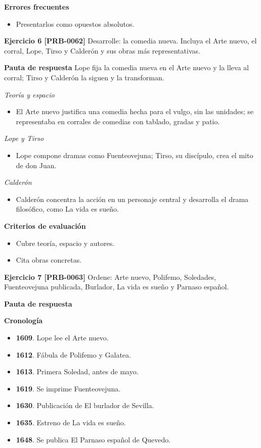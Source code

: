 \documentclass{book}
\begin{document}
\noindent\textbf{Errores frecuentes}
\begin{itemize}
\item Presentarlos como opuestos absolutos.
\end{itemize}

\noindent\textbf{Ejercicio 6 [PRB-0062]}
Desarrolle: la comedia nueva. Incluya el Arte nuevo, el corral, Lope, Tirso y Calderón y sus obras más representativas.


\noindent\textbf{Pauta de respuesta}
Lope fija la comedia nueva en el Arte nuevo y la lleva al corral; Tirso y Calderón la siguen y la transforman.


\noindent\textit{Teoría y espacio}
\begin{itemize}
\item El Arte nuevo justifica una comedia hecha para el vulgo, sin las unidades; se representaba en corrales de comedias con tablado, gradas y patio.
\end{itemize}

\noindent\textit{Lope y Tirso}
\begin{itemize}
\item Lope compone dramas como Fuenteovejuna; Tirso, su discípulo, crea el mito de don Juan.
\end{itemize}

\noindent\textit{Calderón}
\begin{itemize}
\item Calderón concentra la acción en un personaje central y desarrolla el drama filosófico, como La vida es sueño.
\end{itemize}

\noindent\textbf{Criterios de evaluación}
\begin{itemize}
\item Cubre teoría, espacio y autores.
\item Cita obras concretas.
\end{itemize}

\noindent\textbf{Ejercicio 7 [PRB-0063]}
Ordene: Arte nuevo, Polifemo, Soledades, Fuenteovejuna publicada, Burlador, La vida es sueño y Parnaso español.


\noindent\textbf{Pauta de respuesta}

\noindent\textbf{Cronología}
\begin{itemize}
\item \textbf{1609}. Lope lee el Arte nuevo.
\item \textbf{1612}. Fábula de Polifemo y Galatea.
\item \textbf{1613}. Primera Soledad, antes de mayo.
\item \textbf{1619}. Se imprime Fuenteovejuna.
\item \textbf{1630}. Publicación de El burlador de Sevilla.
\item \textbf{1635}. Estreno de La vida es sueño.
\item \textbf{1648}. Se publica El Parnaso español de Quevedo.
\end{itemize}
\end{document}
